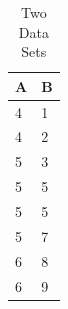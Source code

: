 \begin{table}[ht]
	\centering
	\caption{Two Data Sets}
	\begin{tabular}{ll}
		A & B \\\hline
		4 & 1 \\
		4 & 2 \\
		5 & 3 \\
		5 & 5 \\
		5 & 5 \\
		5 & 7 \\
		6 & 8 \\
		6 & 9 \\\hline
	\end{tabular}
	\label{tbl::04_02}
\end{table}
